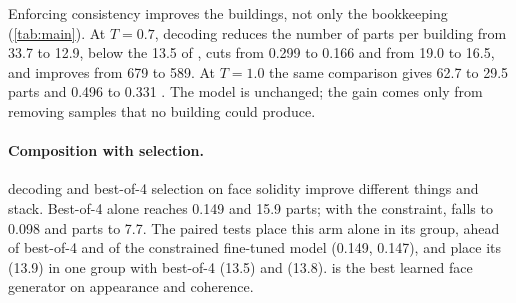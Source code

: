 Enforcing consistency improves the buildings, not only the bookkeeping (\cref{tab:main}). At
$T{=}0.7$, \cfd{} decoding reduces the number of parts per building from 33.7 to 12.9, below the 13.5
of \shellref{}, cuts \mvkid{} from 0.299 to 0.166 and \geomkid{} from 19.0 to 16.5, and improves
\blockscore{} from 679 to 589. At $T{=}1.0$ the same comparison gives 62.7 to 29.5 parts and 0.496 to
0.331 \mvkid{}. The model is unchanged; the gain comes only from removing samples that no building
could produce. 

\paragraph{Composition with selection.}
\cfd{} decoding and best-of-4 selection on face solidity improve different things and stack. Best-of-4
alone reaches \mvkid{} 0.149 and 15.9 parts; with the constraint, \mvkid{} falls to 0.098 and parts to
7.7. The paired tests place this arm alone in its \mvkid{} group, ahead of best-of-4 and of the
constrained fine-tuned model (0.149, 0.147), and place its \geomkid{} (13.9) in one group with
best-of-4 (13.5) and \shellref{} (13.8). \cfd{}  is the best learned face generator on
appearance and coherence.

